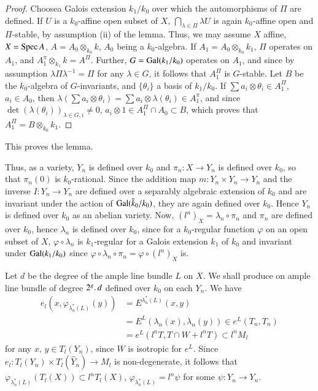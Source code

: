 \begin{proof}
Choose\pageoriginale a Galois extension $k_1/k_0$ over which the automorphisms of $\Pi$ are defined. If $U$ is a $k_0$-affine open subset of $X$, $\bigcap\limits_{\lambda \in \Pi} \lambda U$ is again $k_0$-affine open and $\Pi$-stable, by assumption (ii) of the lemma. Thus, we may assume $X$ affine, $X = \operatorname{Spec} A$, $A = A_0 \otimes_{k_0} k$, $A_0$ being a $k_0$-algebra. If $A_1 = A_0 \otimes_{k_0} k_1$, $\Pi$ operates on $A_1$, and $A^{\pi}_1 \otimes_{k_1} k = A^\Pi$. Further, $G = \operatorname{Gal} (k_1/k_0)$ operates on $A_1$, and since by assumption $\lambda \Pi \lambda^{-1} = \Pi$ for any $\lambda \in G$, it follows that $A^{\Pi}_1$ is $G$-stable. Let $B$ be the $k_0$-algebra of $G$-invariants, and $\{\theta_i\}$ a basis of $k_1/k_0$. If $\sum a_i \otimes \theta_i \in A^{\Pi}_1$, $a_i \in A_0$, then $\lambda (\sum a_i \otimes \theta_i) = \sum a_i \otimes \lambda (\theta_i) \in A^{\pi}_1$, and since $\det (\lambda (\theta_i))_{\lambda \in G,i} \neq 0$, $a_i \otimes 1 \in A^\Pi_1 \cap A_0 \subset B$, which proves that $A^\Pi_1  = B \otimes_{k_0} k_1$.
\end{proof}

This proves the lemma.

Thus, as a variety, $Y_n$ is defined over $k_0$ and $\pi_n: X \to Y_n$ is defined over $k_0$, so that $\pi_n (0)$ is $k_0$-rational. Since the addition map $m: Y_n \times Y_n \to Y_n$ and the inverse $I: Y_n \to Y_n$ are defined over a separably algebraic extension of $k_0$ and are invariant under the action of $\operatorname{Gal}(\bar{k}_0/k_0)$, they are again defined over $k_0$. Hence $Y_n$ is defined over $k_0$ as an abelian variety. Now, $(l^n)_X = \lambda_n \circ \pi_n$ and $\pi_n$ are defined over $k_0$, hence $\lambda_n$ is defined over $k_0$, since for a $k_0$-regular function $\varphi$ on an open subset of $X$, $\varphi \circ \lambda_n$ is $k_1$-regular for a Galois extension $k_1$ of $k_0$ and invariant under $\operatorname{Gal} (k_1/k_0)$ since $\varphi \circ \lambda_n \circ \pi_n = \varphi \circ (l^n)_X$ is. 

Let $d$ be the degree of the ample line bundle $L$ on $X$. We shall produce on ample line bundle of degree $2^g \ldotp d$ defined over $k_0$ on each $Y_n$. We have
\begin{align*}
e_l (x, \varphi_{\lambda^*_n (L)} (y)) & = E^{\lambda^*_n (L)} (x,y) \\
& = E^L (\lambda_n(x), \lambda_n(y)) \in e^L (T_n, T_n)\\
& = e^L (l^n T,T \cap W + l^n T) \subset l^n M_l
\end{align*}
for any $x$, $y \in T_l(Y_n)$, since $W$ is isotropic for $e^L$. Since $e_l : T_l (Y_n) \times T_l (\hat{Y}_n) \to M_l$ is non-degenerate, it follows that $\varphi_{\lambda^*_n (L)} (T_l(X)) \subset l^n T_l(X)$, $\varphi_{\lambda^*_n (L)} = l^n \psi$ for some $\psi: Y_n \to Y_n$.

